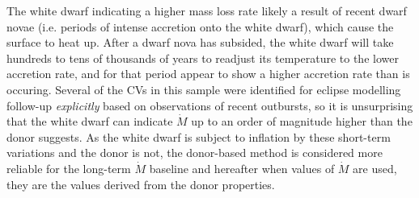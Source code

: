 The white dwarf indicating a higher mass loss rate likely a result of recent dwarf novae (i.e. periods of intense accretion onto the white dwarf), which cause the surface to heat up. After a dwarf nova has subsided, the white dwarf will take hundreds to tens of thousands of years to readjust its temperature to the lower accretion rate, and for that period appear to show a higher accretion rate than is occuring.
Several of the CVs in this sample were identified for eclipse modelling follow-up \textit{explicitly} based on observations of recent outbursts, so it is unsurprising that the white dwarf can indicate $\dot M$ up to an order of magnitude higher than the donor suggests.
As the white dwarf is subject to inflation by these short-term variations and the donor is not, the donor-based method is considered more reliable for the long-term $\dot M$ baseline and hereafter when values of $\dot M$ are used, they are the values derived from the donor properties.
